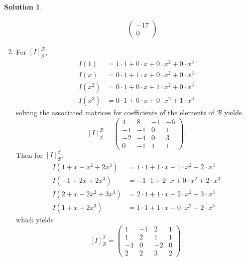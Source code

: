 \documentclass[10pt]{article}
\theoremstyle{definition}
\newtheorem{soln}{Solution}
\begin{document}
\begin{soln}
\begin{enumerate}[label=(\alph*)]
\begin{enumerate}[label=(\roman*)]
\begin{align*}
\begin{pmatrix}
                                                        -17 \\
                                                        0
                                                      \end{pmatrix}
                  \end{align*}
          \end{enumerate}
    \item For $\left[I\right]_\beta^\mathcal{B}$,
          \begin{align*}
            I(1)   & =1\cdot 1 + 0\cdot x + 0\cdot x^2 + 0\cdot x^3 \\
            I(x)   & =0\cdot 1 + 1\cdot x + 0\cdot x^2 + 0\cdot x^3 \\
            I(x^2) & =0\cdot 1 + 0\cdot x + 1\cdot x^2 + 0\cdot x^3 \\
            I(x^3) & =0\cdot 1 + 0\cdot x + 0\cdot x^2 + 1\cdot x^3
          \end{align*}
          solving the associated matrices for coefficients of the elements of $\mathcal{B}$ yields
          $$\left[I\right]_\beta^\mathcal{B}=\begin{pmatrix}
              4  & 8  & -1 & -6 \\
              -1 & -1 & 0  & 1  \\
              -2 & -4 & 0  & 3  \\
              0  & -1 & 1  & 1
            \end{pmatrix}.$$
          Then for $\left[I\right]^\beta_\mathcal{B}$,
          \begin{align*}
            I(1 + x - x^2 + 2x^3)  & =1\cdot 1 + 1\cdot x - 1\cdot x^2 + 2\cdot x^3  \\
            I(-1 + 2x + 2x^3)      & =-1\cdot 1 + 2\cdot x + 0\cdot x^2 + 2\cdot x^3 \\
            I(2 + x - 2x^2 + 3x^3) & =2\cdot 1 + 1\cdot x - 2\cdot x^2 + 3\cdot x^3  \\
            I(1 + x + 2x^3)        & =1\cdot 1 + 1\cdot x + 0\cdot x^2 + 2\cdot x^3
          \end{align*}
          which yields
          $$\left[I\right]^\beta_\mathcal{B}=
            \begin{pmatrix}
              1  & -1 & 2  & 1 \\
              1  & 2  & 1  & 1 \\
              -1 & 0  & -2 & 0 \\
              2  & 2  & 3  & 2
            \end{pmatrix}.$$

\end{enumerate}
\end{soln}
\end{document}
